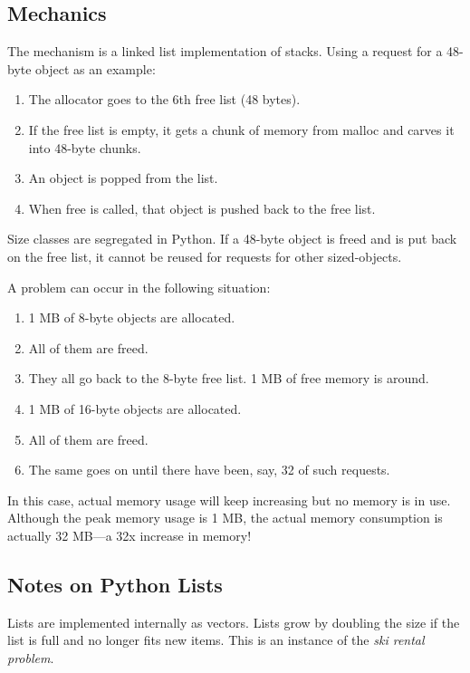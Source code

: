 \documentclass[twoside]{article}
\begin{document}
\subsection{Mechanics}

The mechanism is a linked list implementation of stacks. Using a request for a 48-byte object as an example:

\begin{enumerate}
	\setlength{\itemsep}{0pt}
	\setlength{\parskip}{3pt}
	\item The allocator goes to the 6th free list (48 bytes).
	\item If the free list is empty, it gets a chunk of memory from malloc and carves it into 48-byte chunks.
	\item An object is popped from the list.
	\item When free is called, that object is pushed back to the free list.
\end{enumerate}

Size classes are segregated in Python. If a 48-byte object is freed and is put back on the free list, it cannot be reused for requests for other sized-objects.

A problem can occur in the following situation:

\begin{enumerate}
	\setlength{\itemsep}{0pt}
	\setlength{\parskip}{3pt}
	\item 1 MB of 8-byte objects are allocated.
	\item All of them are freed.
	\item They all go back to the 8-byte free list. 1 MB of free memory is around.
	\item 1 MB of 16-byte objects are allocated.
	\item All of them are freed.
	\item The same goes on until there have been, say, 32 of such requests.
\end{enumerate}

In this case, actual memory usage will keep increasing but no memory is in use. Although the peak memory usage is 1 MB, the actual memory consumption is actually 32 MB---a 32x increase in memory!

\subsection{Notes on Python Lists}

Lists are implemented internally as vectors. Lists grow by doubling the size if the list is full and no longer fits new items. This is an instance of the \textit{ski rental problem}.
\end{document}
